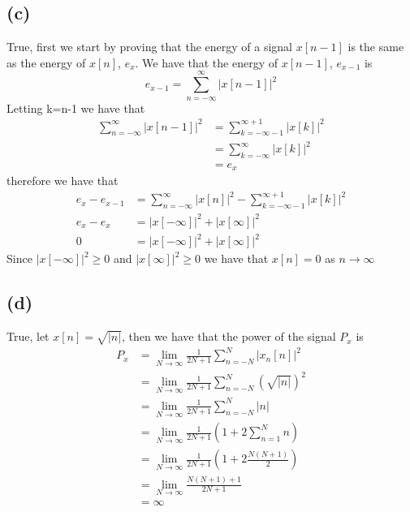 \subsection*{(c)}
True, first we start by proving that the energy of a signal $x[n-1]$ is the 
same as the energy of $x[n]$, $e_x$. We have that the energy of $x[n-1]$, $e_{x-1}$ is 
$$e_{x-1}=\sum_{n=-\infty}^\infty|x[n-1]|^2$$
Letting k=n-1 we have that
\begin{align*}
    \sum_{n=-\infty}^\infty|x[n-1]|^2&=\sum_{k=-\infty-1}^{\infty+1}|x[k]|^2\\
    &=\sum_{k=-\infty}^{\infty}|x[k]|^2\\
    &=e_x
\end{align*}
therefore we have that 
\begin{align*}
e_x-e_{x-1}&=\sum_{n=-\infty}^\infty|x[n]|^2-\sum_{k=-\infty-1}^{\infty+1}|x[k]|^2\\
e_x-e_x&=|x[-\infty]|^2+|x[\infty]|^2\\
0&=|x[-\infty]|^2+|x[\infty]|^2
\end{align*}
Since $|x[-\infty]|^2\geq0$ and $|x[\infty]|^2\geq0$ we have that $x[n]=0$ as $n\to \infty$
\subsection*{(d)}
True, let $x[n]=\sqrt{|n|}$, then we have that the power of the signal $P_x$ is 
\begin{align*}
    P_x&=\lim_{N\rightarrow\infty}\frac{1}{2N+1}\sum_{n=-N}^N|x_n[n]|^2\\
    &=\lim_{N\rightarrow\infty}\frac{1}{2N+1}\sum_{n=-N}^N\left(\sqrt{|n|}\right)^2\\
    &=\lim_{N\rightarrow\infty}\frac{1}{2N+1}\sum_{n=-N}^N|n|\\
    &=\lim_{N\rightarrow\infty}\frac{1}{2N+1}\left(1+2\sum_{n=1}^Nn\right)\\
    &=\lim_{N\rightarrow\infty}\frac{1}{2N+1}\left(1+2\frac{N(N+1)}{2}\right)\\
    &=\lim_{N\rightarrow\infty}\frac{N(N+1)+1}{2N+1}\\
    &=\infty
\end{align*}
